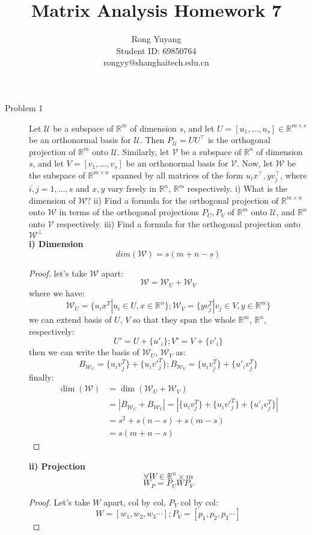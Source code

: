 \documentclass{article}
\title{Matrix Analysis Homework 7}
\author{Rong Yuyang \\ Student ID: 69850764 \\ rongyy@shanghaitech.edu.cn}
\begin{document}
\maketitle

\begin{description}
	\item[Problem 1] Let $\mathcal{U}$ be a subspace of $\mathbb{R}^{m}$ of dimension $s$, and let $U=[u_1,\dots,u_s]\in\mathbb{R}^{m\times s}$ be an orthonormal basis for $\mathcal{U}$. Then $P_{\mathcal{U}} = U U^\top$ is the orthogonal projection of $\mathbb{R}^{m}$ onto $\mathcal{U}$. Similarly, let $\mathcal{V}$ be a subspace of $\mathbb{R}^{n}$ of dimension $s$, and let $V=[v_1,\dots,v_s]$ be an orthonormal basis for $\mathcal{V}$. Now, let $\mathcal{W}$ be the subspace of $\mathbb{R}^{m\times n}$ spanned by all matrices of the form $u_i x^\top, y v_j^\top$, where $i,j=1,\dots,s$ and $x,y$ vary freely in $\mathbb{R}^{n}$, $\mathbb{R}^{m}$ respectively. i) What is the dimension of $\mathcal{W}$? ii) Find a formula for the orthogonal projection of $\mathbb{R}^{m\times n}$ onto $\mathcal{W}$ in terms of the orthogonal projections $P_U,P_V$ of $\mathbb{R}^{m}$ onto $\mathcal{U}$, and $\mathbb{R}^{n}$ onto $\mathcal{V}$ respectively. iii) Find a formula for the orthogonal projection onto $\mathcal{W}^\perp$ \\
	\textbf{i) Dimension}
		$$dim(\mathcal{W}) = s(m+n-s)$$
		\begin{proof}
			let's take $\mathcal{W}$ apart:
			$$\mathcal{W} = \mathcal{W}_U + \mathcal{W}_V$$
			where we have:
			$$ \mathcal{W}_U = \{u_ix^T | u_i \in U, x \in \mathbb{R}^n\}; \mathcal{W}_V = \{yv_j^T | v_j \in V, y \in \mathbb{R}^m\}$$
			we can extend basis of $U$, $V$ so that they span the whole $\mathbb{R}^m$, $\mathbb{R}^n$, respectively:
			$$U' = U + \{u'_i\}; V' = V + \{v'_i\}$$
			then we can write the basis of $ \mathcal{W}_U$, $\mathcal{W}_V$ as:
			$$B_{\mathcal{W}_U} = \{u_iv_j^T\} + \{u_iv'_j^T\}; B_{\mathcal{W}_V} = \{u_iv_j^T\} + \{u'_iv_j^T\}$$
			$$$$
			finally:
			\begin{equation}\begin{aligned}
				\dim(\mathcal{W}) 
				& = \dim(\mathcal{W}_U + \mathcal{W}_V) \\
				& = |B_{\mathcal{W}_U} + B_{\mathcal{W}_V}| 
				 = |\{u_iv_j^T\} + \{u_iv'_j^T\} + \{u'_iv_j^T\}| \\
				& = s^2 + s(n-s) + s(m-s) \\
				& = s(m+n-s)
			\end{aligned}\end{equation} 
		\end{proof}
	\textbf{ii) Projection}
		$$\forall W \in \mathbb{R}^n\times m$$
		$$W_P = P_UWP_V$$
		\begin{proof}
			Let's take $W$ apart, col by col, $P_V$ col by col:
			$$ W = [w_1, w_2, w_3 \cdots]; P_V = [p_1, p_2, p_3 \cdots] $$


\end{proof}
\end{description}
\end{document}
